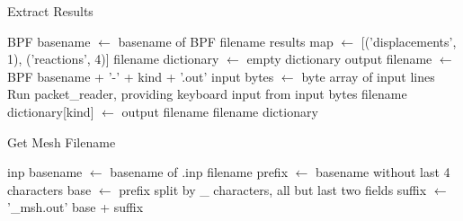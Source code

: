 \begin{algorithm}[tbp]
  \caption{Extract Results}
  \label{alg:extract_results}
  \begin{algorithmic}
    \State BPF basename $\gets$ basename of BPF filename
    \State results map $\gets$ [('displacements', 1), ('reactions', 4)]
    \State filename dictionary $\gets$ empty dictionary
      \State output filename $\gets$ BPF basename + '-' + kind + '.out'
      \State {}
      \State {}
      \State input bytes $\gets$ byte array of input lines
      \State {}
      \State Run packet\_reader, providing keyboard input from input bytes
      \State filename dictionary[kind] $\gets$ output filename
    \EndFor
    \State \Return filename dictionary
    \EndProcedure
  \end{algorithmic}
\end{algorithm}

\begin{algorithm}[tbp]
  \caption{Get Mesh Filename}
  \label{alg:get_mesh_filename}
  \begin{algorithmic}
    \State inp basename $\gets$ basename of .inp filename
    \State prefix $\gets$ basename without last 4 characters 
    \State base $\gets$ prefix split by \_ characters, all but last two fields
    \State suffix $\gets$ '\_msh.out'
    \State \Return base + suffix 
    \EndProcedure
  \end{algorithmic}
\end{algorithm}

